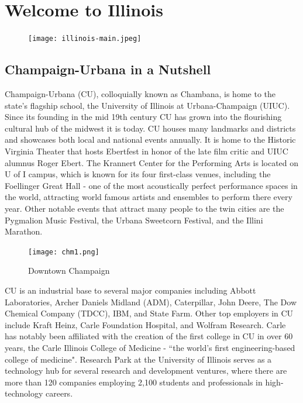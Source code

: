 \section{Welcome to Illinois}

\begin{figure}[H]
  \centering
  \texttt{[image: illinois-main.jpeg]}
\end{figure}

\subsection{Champaign-Urbana in a Nutshell}
Champaign-Urbana (CU), colloquially known as Chambana, is home to the state's flagship school, the University of Illinois at Urbana-Champaign (UIUC). Since its founding in the mid 19th century CU has grown into the flourishing cultural hub of the midwest it is today. CU houses many landmarks and districts and showcases both local and national events annually. It is home to the Historic Virginia Theater that hosts Ebertfest in honor of the late film critic and UIUC alumnus Roger Ebert. The Krannert Center for the Performing Arts is located on U of I campus, which is known for its four first-class venues, including the Foellinger Great Hall - one of the most acoustically perfect performance spaces in the world, attracting world famous artists and ensembles to perform there every year. Other notable events that attract many people to the twin cities are the Pygmalion Music Festival, the Urbana Sweetcorn Festival, and the Illini Marathon. 

\begin{figure}
  \begin{center}
  \vspace{-\baselineskip}
    \texttt{[image: chm1.png]}
    \caption{Downtown Champaign}
  \end{center}
\end{figure}


CU is an industrial base to several major companies including Abbott Laboratories, Archer Daniels Midland (ADM), Caterpillar, John Deere, The Dow Chemical Company (TDCC), IBM, and State Farm. Other top employers in CU include Kraft Heinz, Carle Foundation Hospital, and Wolfram Research. Carle has notably been affiliated with the creation of the first college in CU in over 60 years, the Carle Illinois College of Medicine -  ``the world's first engineering-based college of medicine". Research Park at the University of Illinois serves as a technology hub for several research and development ventures, where there are more than 120 companies employing 2,100 students and professionals in high-technology careers.


